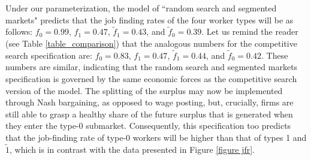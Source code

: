 \documentclass[12pt]{article} %
\theoremstyle{definition}
\begin{document}
\begin{appendix}
Under our parameterization, the model of ``random search and segmented markets" predicts that the job
finding rates of the four worker types will be as follows: $f_0=0.99$, $f_1=0.47$, $\tilde{f}_1=0.43$, and $\tilde{f}_0=0.39$. Let us remind the reader (see Table \ref{table_comparison}) that the analogous numbers for the competitive search specification are: $f_0=0.83$, $f_1=0.47$, $\tilde{f}_1=0.44$, and $\tilde{f}_0=0.42$. These numbers are similar, indicating that the random search and segmented markets specification is governed by the same economic forces as the competitive search version of the model. The splitting of the surplus may now be implemented through Nash bargaining, as opposed to wage posting, but, crucially, firms are still able to grasp a healthy share of the future surplus that is generated when they enter the type-0 submarket. Consequently, this specification too predicts that the job-finding rate of type-0 workers will be higher than that of types 1 and $\tilde{1}$, which is in contrast with the data presented in Figure \ref{figure jfr}. 




\end{appendix}
\end{document}

